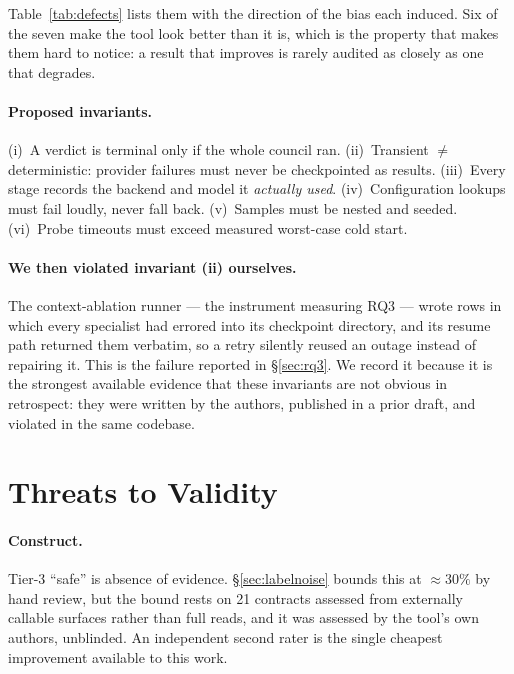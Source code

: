 \documentclass[sigconf,nonacm]{acmart}
\begin{document}
Table~\ref{tab:defects} lists them with the direction of the bias each induced.
Six of the seven make the tool look better than it is, which is the property that
makes them hard to notice: a result that improves is rarely audited as closely as
one that degrades.

\paragraph{Proposed invariants.}
(i)~A verdict is terminal only if the whole council ran. (ii)~Transient
$\neq$ deterministic: provider failures must never be checkpointed as results.
(iii)~Every stage records the backend and model it \emph{actually used}.
(iv)~Configuration lookups must fail loudly, never fall back. (v)~Samples must be
nested and seeded. (vi)~Probe timeouts must exceed measured worst-case cold
start.

\paragraph{We then violated invariant (ii) ourselves.}
The context-ablation runner --- the instrument measuring RQ3 --- wrote rows in
which every specialist had errored into its checkpoint directory, and its resume
path returned them verbatim, so a retry silently reused an outage instead of
repairing it. This is the failure reported in \S\ref{sec:rq3}. We record it
because it is the strongest available evidence that these invariants are not
obvious in retrospect: they were written by the authors, published in a prior
draft, and violated in the same codebase.

\section{Threats to Validity}
\label{sec:threats}

\paragraph{Construct.}
Tier-3 ``safe'' is absence of evidence. \S\ref{sec:labelnoise} bounds this at
${\approx}30\%$ by hand review, but the bound rests on 21 contracts assessed from
externally callable surfaces rather than full reads, and it was assessed by the
tool's own authors, unblinded. An independent second rater is the single cheapest
improvement available to this work.
\end{document}

